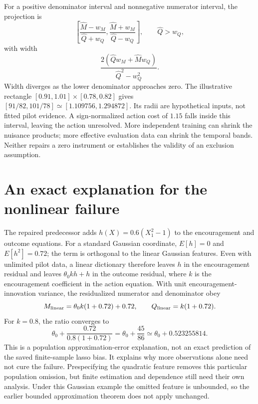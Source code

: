 For a positive denominator interval and nonnegative numerator interval, the
projection is
\begin{equation}
 \left[\frac{\widehat M-w_M}{\widehat Q+w_Q},
       \frac{\widehat M+w_M}{\widehat Q-w_Q}\right],
 \qquad \widehat Q>w_Q,
\end{equation}
with width
\begin{equation}
 \frac{2(\widehat Qw_M+\widehat Mw_Q)}{\widehat Q^2-w_Q^2}.
 \label{exec13:pilot-width}
\end{equation}
Width diverges as the lower denominator approaches zero. The illustrative
rectangle $[0.91,1.01]\times[0.78,0.82]$ gives
$[91/82,101/78]\simeq[1.109756,1.294872]$. Its radii are hypothetical
inputs, not fitted pilot evidence. A sign-normalized action cost of $1.15$
falls inside this interval, leaving the action unresolved. More independent
training can shrink the nuisance products; more effective evaluation data can
shrink the temporal bands. Neither repairs a zero instrument or establishes
the validity of an exclusion assumption.

\section{An exact explanation for the nonlinear failure}

The repaired predecessor adds $h(X)=0.6(X_1^2-1)$ to the encouragement and
outcome equations. For a standard Gaussian coordinate, $E[h]=0$ and
$E[h^2]=0.72$; the term is orthogonal to the linear Gaussian features.
Even with unlimited pilot data, a linear dictionary therefore leaves $h$
in the encouragement residual and leaves $\theta_0kh+h$ in the outcome
residual, where $k$ is the encouragement coefficient in the action equation.
With unit encouragement-innovation variance, the residualized numerator and
denominator obey
\begin{equation}
 M_{\rm linear}=\theta_0 k(1+0.72)+0.72,\qquad
 Q_{\rm linear}=k(1+0.72).
\end{equation}
For $k=0.8$, the ratio converges to
\begin{equation}
 \theta_0+\frac{0.72}{0.8(1+0.72)}
 =\theta_0+\frac{45}{86}
 \simeq\theta_0+0.523255814.
\end{equation}
This is a population approximation-error explanation, not an exact prediction
of the saved finite-sample lasso bias. It explains why more observations alone
need not cure the failure. Prespecifying the quadratic feature removes this
particular population omission, but finite estimation and dependence still
need their own analysis. Under this Gaussian example the omitted feature is
unbounded, so the earlier bounded approximation theorem does not apply unchanged.

